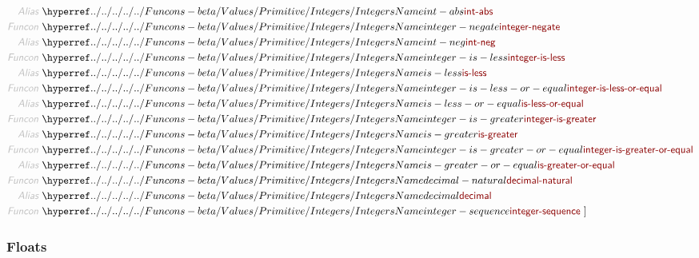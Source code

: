 \begin{align*}
  \KEY{Alias} ~ & \NAMEHYPER{../../../../../Funcons-beta/Values/Primitive}{Integers}{int-abs} \\
  \KEY{Funcon} ~ & \NAMEHYPER{../../../../../Funcons-beta/Values/Primitive}{Integers}{integer-negate} \\
  \KEY{Alias} ~ & \NAMEHYPER{../../../../../Funcons-beta/Values/Primitive}{Integers}{int-neg} \\
  \KEY{Funcon} ~ & \NAMEHYPER{../../../../../Funcons-beta/Values/Primitive}{Integers}{integer-is-less} \\
  \KEY{Alias} ~ & \NAMEHYPER{../../../../../Funcons-beta/Values/Primitive}{Integers}{is-less} \\
  \KEY{Funcon} ~ & \NAMEHYPER{../../../../../Funcons-beta/Values/Primitive}{Integers}{integer-is-less-or-equal} \\
  \KEY{Alias} ~ & \NAMEHYPER{../../../../../Funcons-beta/Values/Primitive}{Integers}{is-less-or-equal} \\
  \KEY{Funcon} ~ & \NAMEHYPER{../../../../../Funcons-beta/Values/Primitive}{Integers}{integer-is-greater} \\
  \KEY{Alias} ~ & \NAMEHYPER{../../../../../Funcons-beta/Values/Primitive}{Integers}{is-greater} \\
  \KEY{Funcon} ~ & \NAMEHYPER{../../../../../Funcons-beta/Values/Primitive}{Integers}{integer-is-greater-or-equal} \\
  \KEY{Alias} ~ & \NAMEHYPER{../../../../../Funcons-beta/Values/Primitive}{Integers}{is-greater-or-equal} \\
  \KEY{Funcon} ~ & \NAMEHYPER{../../../../../Funcons-beta/Values/Primitive}{Integers}{decimal-natural} \\
  \KEY{Alias} ~ & \NAMEHYPER{../../../../../Funcons-beta/Values/Primitive}{Integers}{decimal} \\
  \KEY{Funcon} ~ & \NAMEHYPER{../../../../../Funcons-beta/Values/Primitive}{Integers}{integer-sequence}
  ~ ]
\end{align*}
\subsubsection*{Floats}\hypertarget{floats}{}\label{floats}

